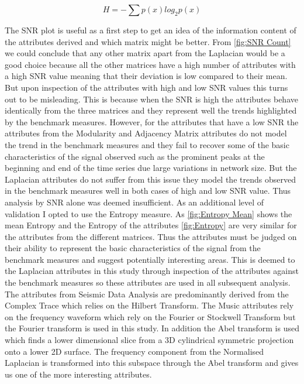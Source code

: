 \begin{equation}
   H =  - \sum{p(x) log_{2}p(x)} 
\end{equation}

The SNR plot is useful as a first step to get an idea of the information content of the attributes derived and which matrix might be better. From \ref{fig:SNR Count} we could conclude that any other matrix apart from the Laplacian would be a good choice because all the other matrices have a high number of attributes with a high SNR value meaning that their deviation is low compared to their mean. But upon inspection of the attributes with high and low SNR values this turns out to be misleading. This is because when the SNR is high the attributes behave identically from the three matrices and they represent well the trends highlighted by the benchmark measures. However, for the attributes that have a low SNR the attributes from the Modularity and Adjacency Matrix attributes do not model the trend in the benchmark measures and they fail to recover some of the basic characteristics of the signal observed such as the prominent peaks at the beginning and end of the time series due large variations in network size. But the Laplacian attributes do not suffer from this issue they model the trends observed in the benchmark measures well in both cases of high and low SNR value. Thus analysis by SNR alone was deemed insufficient. As an additional level of validation I opted to use the Entropy measure. As \ref{fig:Entropy Mean} shows the mean Entropy and the Entropy of the attributes \ref{fig:Entropy} are very similar for the attributes from the different matrices. Thus the attributes must be judged on their ability to represent the basic characteristics of the signal from the benchmark measures and suggest potentially interesting areas. This is deemed to the Laplacian attributes in this study through inspection of the attributes against the benchmark measures so these attributes are used in all subsequent analysis. \\


The attributes from Seismic Data Analysis are predominantly derived from the Complex Trace which relies on the Hilbert Transform. The Music attributes rely on the frequency waveform which rely on the Fourier or Stockwell Transform but the Fourier transform is used in this study. In addition the Abel transform is used which finds a lower dimensional slice from a 3D cylindrical symmetric projection onto a lower 2D surface. The frequency component from the Normalised Laplacian is transformed into this subspace through the Abel transform and gives us one of the more interesting attributes. \\

